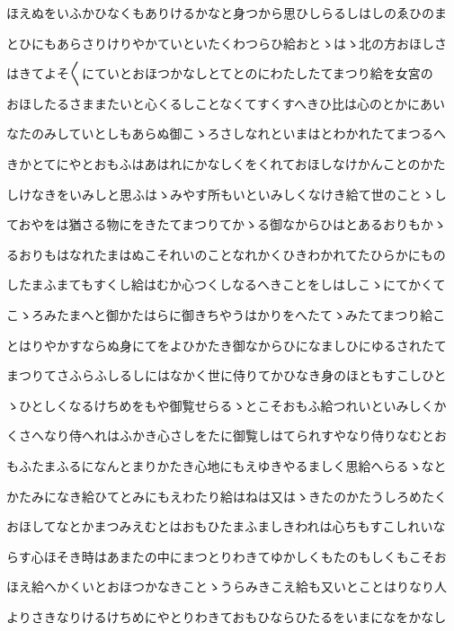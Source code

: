 \documentclass[a4paper,11pt,landscape]{ltjtarticle}
\begin{document}
ほえぬをいふかひなくもありけるかなと身つから思ひしらるしはしのゑひのま
\par\medskip
とひにもあらさりけりやかていといたくわつらひ給おとゝはゝ北の方おほしさ
\par\medskip
はきてよそ〱にていとおほつかなしとてとのにわたしたてまつり給を女宮の
\par\medskip
おほしたるさままたいと心くるしことなくてすくすへきひ比は心のとかにあい
\par\medskip
なたのみしていとしもあらぬ御こゝろさしなれといまはとわかれたてまつるへ
\par\medskip
きかとてにやとおもふはあはれにかなしくをくれておほしなけかんことのかた
\par\medskip
しけなきをいみしと思ふはゝみやす所もいといみしくなけき給て世のことゝし
\par\medskip
ておやをは猶さる物にをきたてまつりてかゝる御なからひはとあるおりもかゝ
\par\medskip
るおりもはなれたまはぬこそれいのことなれかくひきわかれてたひらかにもの
\par\medskip
したまふまてもすくし給はむか心つくしなるへきことをしはしこゝにてかくて
\par\medskip
こゝろみたまへと御かたはらに御きちやうはかりをへたてゝみたてまつり給こ
\par\medskip
とはりやかすならぬ身にてをよひかたき御なからひになましひにゆるされたて
\par\medskip
まつりてさふらふしるしにはなかく世に侍りてかひなき身のほともすこしひと
\par\medskip
ゝひとしくなるけちめをもや御覧せらるゝとこそおもふ給つれいといみしくか
\par\medskip
くさへなり侍へれはふかき心さしをたに御覧しはてられすやなり侍りなむとお
\par\medskip
もふたまふるになんとまりかたき心地にもえゆきやるましく思給へらるゝなと
\par\medskip
かたみになき給ひてとみにもえわたり給はねは又はゝきたのかたうしろめたく
\par\medskip
おほしてなとかまつみえむとはおもひたまふましきわれは心ちもすこしれいな
\par\medskip
らす心ほそき時はあまたの中にまつとりわきてゆかしくもたのもしくもこそお
\par\medskip
ほえ給へかくいとおほつかなきことゝうらみきこえ給も又いとことはりなり人
\par\medskip
よりさきなりけるけちめにやとりわきておもひならひたるをいまになをかなし
\par\medskip
\end{document}
